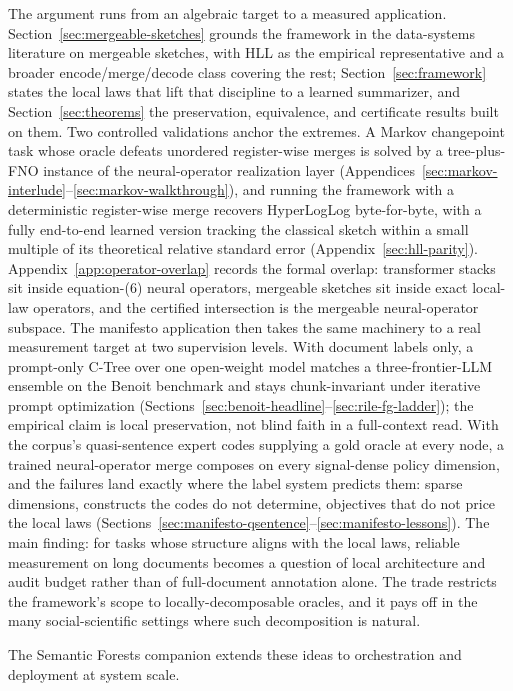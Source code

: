 The argument runs from an algebraic target to a measured application.
Section~\ref{sec:mergeable-sketches} grounds the framework in
the data-systems literature on mergeable sketches, with HLL as the
empirical representative and a broader encode/merge/decode class
covering the rest; Section~\ref{sec:framework} states the local laws
that lift that discipline to a learned summarizer, and
Section~\ref{sec:theorems} the preservation, equivalence, and
certificate results built on them. Two controlled validations anchor
the extremes. A Markov changepoint task whose oracle defeats unordered
register-wise merges is solved by a tree-plus-FNO instance of the
neural-operator realization layer
(Appendices~\ref{sec:markov-interlude}--\ref{sec:markov-walkthrough}),
and running the framework with a deterministic register-wise merge
recovers HyperLogLog byte-for-byte, with a fully end-to-end learned
version tracking the classical sketch within a small multiple of its
theoretical relative standard error (Appendix~\ref{sec:hll-parity}).
Appendix~\ref{app:operator-overlap} records the
formal overlap: transformer stacks sit inside equation-(6) neural
operators, mergeable sketches sit inside exact local-law operators, and
the certified intersection is the mergeable neural-operator subspace.
The manifesto application then takes the same machinery to a real
measurement target at two supervision levels. With document labels
only, a prompt-only C-Tree over one open-weight model matches a
three-frontier-LLM ensemble on the Benoit benchmark and stays
chunk-invariant under iterative prompt optimization
(Sections~\ref{sec:benoit-headline}--\ref{sec:rile-fg-ladder}); the
empirical claim is local preservation, not blind faith in a
full-context read. With the corpus's quasi-sentence expert codes
supplying a gold oracle at every node, a trained neural-operator merge
composes on every signal-dense policy dimension, and the failures land
exactly where the label system predicts them: sparse dimensions,
constructs the codes do not determine, objectives that do not price
the local laws
(Sections~\ref{sec:manifesto-qsentence}--\ref{sec:manifesto-lessons}).
The main finding: for
tasks whose structure aligns with the local laws, reliable measurement
on long documents becomes a question of local architecture and audit
budget rather than of full-document annotation alone. The trade
restricts the framework's scope to locally-decomposable oracles, and it
pays off in the many social-scientific settings where such
decomposition is natural.

The Semantic Forests companion extends these ideas to orchestration
and deployment at system scale.
